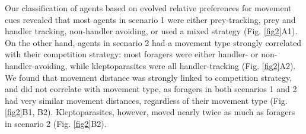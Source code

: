 
Our classification of agents based on evolved relative preferences for movement cues revealed that most agents in scenario 1 were either prey-tracking, prey and handler tracking, non-handler avoiding, or used a mixed strategy (Fig. \ref{fig2}A1).
On the other hand, agents in scenario 2 had a movement type strongly correlated with their competition strategy: most foragers were either handler- or non-handler-avoiding, while kleptoparasites were all handler-tracking (Fig. \ref{fig2}A2).
We found that movement distance was strongly linked to competition strategy, and did not correlate with movement type, as foragers in both scenarios 1 and 2 had very similar movement distances, regardless of their movement type (Fig. \ref{fig2}B1, B2).
Kleptoparasites, however, moved nearly twice as much as foragers in scenario 2 (Fig. \ref{fig2}B2).

